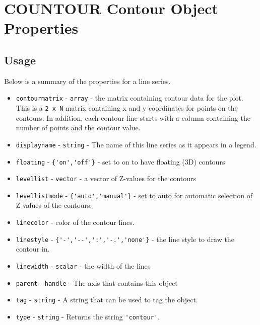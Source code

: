 \section{COUNTOUR Contour Object Properties}

\subsection{Usage}

Below is a summary of the properties for a line series.
\begin{itemize}
\item  \verb|contourmatrix| - \verb|array| - the matrix containing contour data
 for the plot.  This is a \verb|2 x N| matrix containing x and y coordinates
 for points on the contours.  In addition, each contour line starts with
 a column containing the number of points and the contour value.

\item  \verb|displayname| - \verb|string| - The name of this line series as it
    appears in a legend.

\item  \verb|floating| - \verb|{'on','off'}| - set to on to have floating (3D) contours

\item  \verb|levellist| - \verb|vector| - a vector of Z-values for the contours

\item  \verb|levellistmode| - \verb|{'auto','manual'}| - set to auto for 
    automatic selection  of Z-values of the contours.

\item  \verb|linecolor| - color of the contour lines.

\item  \verb|linestyle| - \verb|{'-','--',':','-.','none'}| - the line style to draw the contour in.

\item  \verb|linewidth| - \verb|scalar| - the width of the lines

\item  \verb|parent| - \verb|handle| - The axis that contains this object

\item  \verb|tag| - \verb|string| - A string that can be used to tag the object.

\item  \verb|type| - \verb|string| - Returns the string \verb|'contour'|.


\end{itemize}
